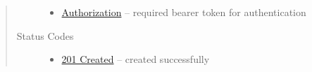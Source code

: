 \documentclass[letterpaper,10pt,english]{sphinxmanual}
\begin{document}
\begin{fulllineitems}
\begin{quote}
\begin{description}
\begin{itemize}
\item {} 
\href{http://tools.ietf.org/html/rfc7235\#section-4.2}{Authorization} -- required bearer token for authentication

\end{itemize}

\item[{Status Codes}] \leavevmode\begin{itemize}
\item {} 
\href{http://www.w3.org/Protocols/rfc2616/rfc2616-sec10.html\#sec10.2.2}{201 Created} -- created successfully

\end{itemize}

\end{description}\end{quote}

\end{fulllineitems}
\end{document}
